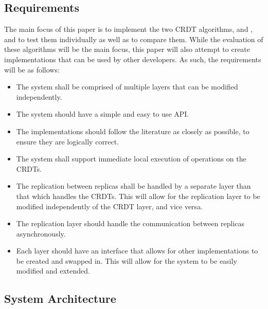 \documentclass[12pt]{article}
\begin{document}
\subsection{Requirements}
The main focus of this paper is to implement the two CRDT algorithms, \cite{9563274} and \cite{https://doi.org/10.48550/arxiv.2103.04828}, and to test them individually as well as to compare them. While the evaluation of these algorithms will be the main focus, this paper will also attempt to create implementations that can be used by other developers. As such, the requirements will be as follows:
\begin{itemize}
    \item The system shall be comprised of multiple layers that can be modified independently.
    \item The system should have a simple and easy to use API.
    \item The implementations should follow the literature as closely as possible, to ensure they are logically correct.
    \item The system shall support immediate local execution of operations on the CRDTs.
    \item The replication between replicas shall be handled by a separate layer than that which handles the CRDTs. This will allow for the replication layer to be modified independently of the CRDT layer, and vice versa.
    \item The replication layer should handle the communication between replicas asynchronously.
    \item Each layer should have an interface that allows for other implementations to be created and swapped in. This will allow for the system to be easily modified and extended.
\end{itemize}

\subsection{System Architecture}
\end{document}
